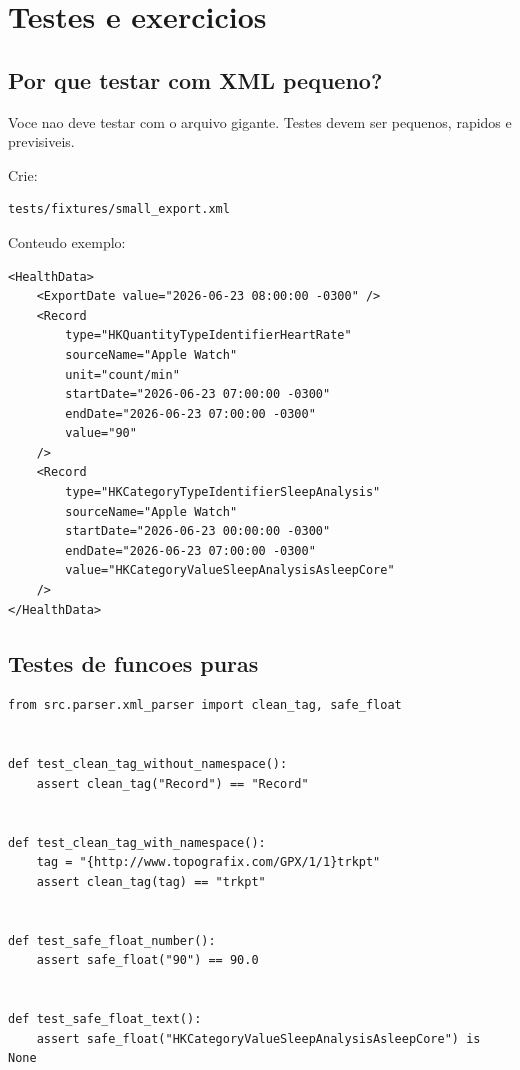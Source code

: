 \chapter{Testes e exercicios}

\section{Por que testar com XML pequeno?}

Voce nao deve testar com o arquivo gigante. Testes devem ser pequenos, rapidos e previsiveis.

Crie:

\begin{verbatim}
tests/fixtures/small_export.xml
\end{verbatim}

Conteudo exemplo:

\begin{lstlisting}[style=devbutterbash]
<HealthData>
    <ExportDate value="2026-06-23 08:00:00 -0300" />
    <Record
        type="HKQuantityTypeIdentifierHeartRate"
        sourceName="Apple Watch"
        unit="count/min"
        startDate="2026-06-23 07:00:00 -0300"
        endDate="2026-06-23 07:00:00 -0300"
        value="90"
    />
    <Record
        type="HKCategoryTypeIdentifierSleepAnalysis"
        sourceName="Apple Watch"
        startDate="2026-06-23 00:00:00 -0300"
        endDate="2026-06-23 07:00:00 -0300"
        value="HKCategoryValueSleepAnalysisAsleepCore"
    />
</HealthData>
\end{lstlisting}

\section{Testes de funcoes puras}

\begin{lstlisting}[style=devbutterpython]
from src.parser.xml_parser import clean_tag, safe_float


def test_clean_tag_without_namespace():
    assert clean_tag("Record") == "Record"


def test_clean_tag_with_namespace():
    tag = "{http://www.topografix.com/GPX/1/1}trkpt"
    assert clean_tag(tag) == "trkpt"


def test_safe_float_number():
    assert safe_float("90") == 90.0


def test_safe_float_text():
    assert safe_float("HKCategoryValueSleepAnalysisAsleepCore") is None
\end{lstlisting}

